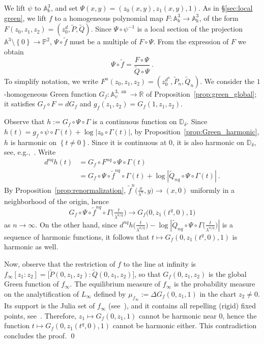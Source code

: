 \documentclass[11 pt, oneside, a4paper]{amsart}
\newcommand{\R}{\mathbb{R}}
\newcommand{\D}{\mathbb{D}}
\newcommand{\A}{\mathbb{A}}
\renewcommand{\P}{\mathbb{P}}
\newcommand{\wt}{\widetilde}
\newcommand{\abs}[1]{{\left|{#1}\right|}}
\newcommand{\set}[1]{{\left\{#1\right\}}}
\newcommand{\nk}{\Bbbk}
\DeclareMathOperator{\an}{an}
\newcommand{\inv}{^{-1}}
\theoremstyle{definition}
\theoremstyle{definition}
\begin{document}
We lift $\psi$ to $\A^3_\nk$, and set $\Psi(x,y) = (z_0(x,y),z_1(x,y),1)$. 
As in \S\ref{sec:local green}, we lift $f$ to a homogeneous polynomial map $F\colon \A^3_\nk \to  \A^3_\nk$, of the form 
$F(z_0,z_1,z_2) = (z_0^d ,\wt{P},\wt{Q})$. Since $\Psi \circ \psi \inv$ is a local section of the projection $\A^3\setminus \set{0}\to \P^2$, 
$\Psi \circ \widetilde{f}$   
must be a multiple of $F\circ \Psi$. From the expression of $F$ we obtain
\[
\Psi \circ \widetilde{f} = \frac{F \circ \Psi}{\wt{Q} \circ \Psi}~.
\]
To simplify notation, we write 
$F^n(z_0,z_1,z_2) = (z_0^{d^n} ,\wt{P}_n,\wt{Q}_n)$. 
We consider the $1$-homoge\-neous Green function $G_f \colon \A^{3,\an}_v \to \R$ of Proposition~\ref{prop:green_global};  
it satisfies
$G_f \circ F = d G_f$ and $g_f(z_1,z_2)= G_f(1,z_1,z_2)$.

Observe that  $h := G_f \circ \Psi \circ \Gamma $ is a continuous  function on $\D_\delta$. 
Since  $h(t) = g_f \circ \psi \circ \Gamma (t) + \log |z_0 \circ \Gamma(t)|$, 
by Proposition~\ref{prop:Green_harmonic}, $h$ is harmonic on $\set{t\neq0}$. 
Since it is continuous at $0$, it is also harmonic on $\D_\delta$, see, e.g.,~\cite[Lemma 3.7]{favre-gauthier:classcurvescubicpol}.
Write
\begin{align*}
d^{nq} h (t) 
&= 
G_f \circ F^{nq}\circ \Psi \circ \Gamma (t)
\\
&= 
G_f \circ \Psi \circ \widetilde{f}^{nq} \circ \Gamma(t) + \log \abs{\wt{Q}_{nq} \circ \Psi \circ \Gamma(t)}~.
\end{align*}
By Proposition~\ref{prop:renormalization}, $\widetilde{f}^{n} \big(\frac{x}{\lambda^n},y\big) \to (x,0)$ uniformly in a neighborhood of the origin, hence
\[G_f \circ \Psi \circ \widetilde{f}^{nq} \circ \Gamma \big(\tfrac{t}{\lambda^{n/q}}\big) \to G_f \big(0, z_1(t^q,0), 1\big)\]
as $n\to\infty$. 
On the other hand, 
since $d^{nq} h \big(\tfrac{t}{\lambda^{n/q}}\big)  - \log \abs{\wt{Q}_{nq} \circ \Psi \circ \Gamma\big(\tfrac{t}{\lambda^{n/q}}\big)}$ is a sequence of harmonic functions, 
it follows that $t \mapsto G_f (0, z_1(t^q,0), 1)$ is   harmonic as well. 

Now, observe that the restriction of $f$ to the line at infinity is 
$f_\infty [z_1:z_2] = \big[ \wt{P}(0,z_1,z_2) : \wt{Q}(0,z_1,z_2)\big]$, so that
$G_f (0,z_1, z_2)$ is the global Green function of $f_\infty$. 
The equilibrium measure of $f_\infty$ is the probability measure
on the analytification of $L_\infty$ defined by  
$\mu_{f_\infty} := \Delta G_f (0,z_1, 1)$ in the chart $z_2\neq 0$. 
Its support is the Julia set of $f_\infty$ (see~\cite[Theorem~13.39]{benedetto:dyn1NA}), 
and it contains all repelling (rigid) fixed points, see~\cite[Theorem~8.7]{benedetto:dyn1NA}.
Therefore,  $z_1\mapsto 
G_f (0, z_1, 1)$ cannot be harmonic near $0$,
hence the function $t \mapsto  G_f (0, z_1(t^q,0), 1)$ cannot be harmonic either. 
This  contradiction concludes the proof. \qed
 
\end{document}
